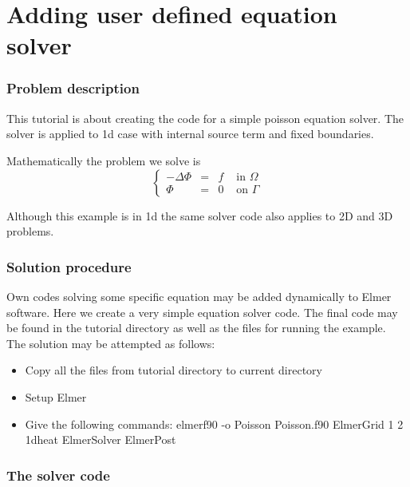 \chapter{Adding user defined equation solver}


\subsection*{Problem description}

This tutorial is about creating the code for a simple poisson equation solver.
The solver is applied to 1d case with internal source term and fixed boundaries.

Mathematically the problem we solve is
\begin{equation}
\left \{
\begin{array}{cccc}
- \Delta \Phi &= &f & \mbox{ in } \Omega \\
\Phi&=&0 & \mbox{ on } \Gamma
\end{array}
\right .
\end{equation}

Although this example is in 1d the same solver code also applies to 2D and 3D
problems.

\subsection*{Solution procedure}

Own codes solving some specific equation may be added dynamically to Elmer 
software. Here we create a very simple equation solver code. The final code
may be found in the tutorial directory as well as the files for running
the example. The solution may be attempted as follows:

\begin{itemize}
\item Copy all the files from tutorial directory to current directory
\item Setup Elmer
\item Give the following commands:
\ttbegin
elmerf90 -o Poisson Poisson.f90
ElmerGrid 1 2 1dheat
ElmerSolver
ElmerPost
\ttend
\end{itemize}

\subsection*{The solver code}

